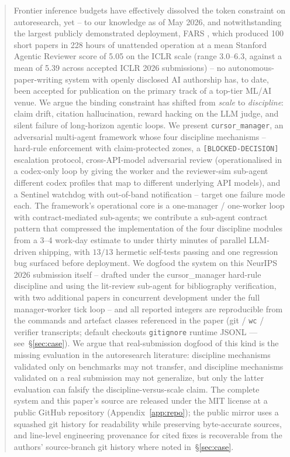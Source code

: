 \begin{abstract}
Frontier inference budgets have effectively dissolved the token
constraint on autoresearch, yet -- to our knowledge as of May 2026,
and notwithstanding the largest publicly demonstrated deployment,
FARS \citep{fars2026analemma}, which produced 100 short papers in
228 hours of unattended operation at a mean Stanford Agentic
Reviewer score of 5.05 on the ICLR scale (range 3.0--6.3, against
a mean of 5.39 across accepted ICLR 2026 submissions) -- no
autonomous-paper-writing system with openly disclosed AI authorship
has, to date, been accepted for publication on the primary track of
a top-tier ML/AI venue. We argue the binding constraint has shifted from
\emph{scale} to \emph{discipline}: claim drift, citation
hallucination, reward hacking on the LLM judge, and silent failure of
long-horizon agentic loops. We present \texttt{cursor\_manager}, an
adversarial multi-agent framework whose four discipline mechanisms --
hard-rule enforcement with claim-protected zones, a
\texttt{[BLOCKED-DECISION]} escalation protocol, cross-API-model
adversarial review (operationalised in a codex-only loop by giving
the worker and the reviewer-sim sub-agent different codex profiles
that map to different underlying API models), and a Sentinel
watchdog with out-of-band notification -- target one failure mode
each. The framework's
operational core is a one-manager / one-worker loop with
contract-mediated sub-agents; we contribute a sub-agent contract
pattern that compressed the implementation of the four discipline
modules from a 3--4 work-day estimate to under thirty minutes of
parallel LLM-driven shipping, with \(13/13\) hermetic self-tests
passing and one regression bug surfaced before deployment. We
dogfood the system on this NeurIPS 2026 submission itself --
drafted under the cursor\_manager hard-rule discipline and using the
lit-review sub-agent for bibliography verification, with two
additional papers in concurrent development under the full
manager-worker tick loop -- and all reported integers are reproducible from
the commands and artefact classes referenced in the paper (git / \texttt{wc} /
verifier transcripts; default checkouts \texttt{gitignore} runtime JSONL ---
see~\S\ref{sec:case}). We argue
that real-submission dogfood of this kind is the missing evaluation
in the autoresearch literature: discipline mechanisms validated only
on benchmarks may not transfer, and discipline mechanisms validated
on a real submission may not generalize, but only the latter
evaluation can falsify the discipline-versus-scale claim. The
complete system and this paper's source are released under the MIT
license at a public GitHub repository (Appendix~\ref{app:repo}); the public mirror
uses a squashed git history for readability while preserving byte-accurate
sources, and line-level engineering provenance for cited fixes is
recoverable from the authors' source-branch git history where noted in~\S\ref{sec:case}.
\end{abstract}

